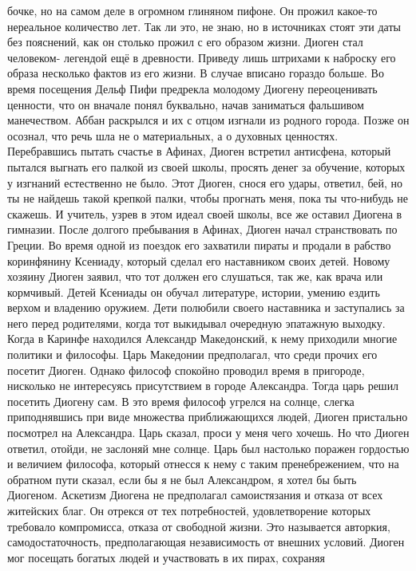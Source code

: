 бочке, но на самом деле в огромном глиняном пифоне. Он прожил какое-то
нереальное количество лет. Так ли это, не знаю, но в источниках стоят эти даты
без пояснений, как он столько прожил с его образом жизни. Диоген стал человеком-
легендой ещё в древности. Приведу лишь штрихами к наброску его образа несколько
фактов из его жизни. В случае вписано гораздо больше. Во время посещения Дельф
Пифи предрекла молодому Диогену переоценивать ценности, что он вначале понял
буквально, начав заниматься фальшивом манечеством. Аббан раскрылся и их с отцом
изгнали из родного города. Позже он осознал, что речь шла не о материальных, а о
духовных ценностях. Перебравшись пытать счастье в Афинах, Диоген встретил
антисфена, который пытался выгнать его палкой из своей школы, просять денег за
обучение, которых у изгнаний естественно не было. Этот Диоген, снося его удары,
ответил, бей, но ты не найдешь такой крепкой палки, чтобы прогнать меня, пока ты
что-нибудь не скажешь. И учитель, узрев в этом идеал своей школы, все же оставил
Диогена в гимназии. После долгого пребывания в Афинах, Диоген начал
странствовать по Греции. Во время одной из поездок его захватили пираты и
продали в рабство коринфянину Ксениаду, который сделал его наставником своих
детей. Новому хозяину Диоген заявил, что тот должен его слушаться, так же, как
врача или кормчивый. Детей Ксениады он обучал литературе, истории, умению ездить
верхом и владению оружием. Дети полюбили своего наставника и заступались за него
перед родителями, когда тот выкидывал очередную эпатажную выходку. Когда в
Каринфе находился Александр Македонский, к нему приходили многие политики и
философы. Царь Македонии предполагал, что среди прочих его посетит Диоген.
Однако философ спокойно проводил время в пригороде, нисколько не интересуясь
присутствием в городе Александра. Тогда царь решил посетить Диогену сам. В это
время философ угрелся на солнце, слегка приподнявшись при виде множества
приближающихся людей, Диоген пристально посмотрел на Александра. Царь сказал,
проси у меня чего хочешь. Но что Диоген ответил, отойди, не заслоняй мне солнце.
Царь был настолько поражен гордостью и величием философа, который отнесся к нему
с таким пренебрежением, что на обратном пути сказал, если бы я не был
Александром, я хотел бы быть Диогеном. Аскетизм Диогена не предполагал
самоистязания и отказа от всех житейских благ. Он отрекся от тех потребностей,
удовлетворение которых требовало компромисса, отказа от свободной жизни. Это
называется авторкия, самодостаточность, предполагающая независимость от внешних
условий. Диоген мог посещать богатых людей и участвовать в их пирах, сохраняя
